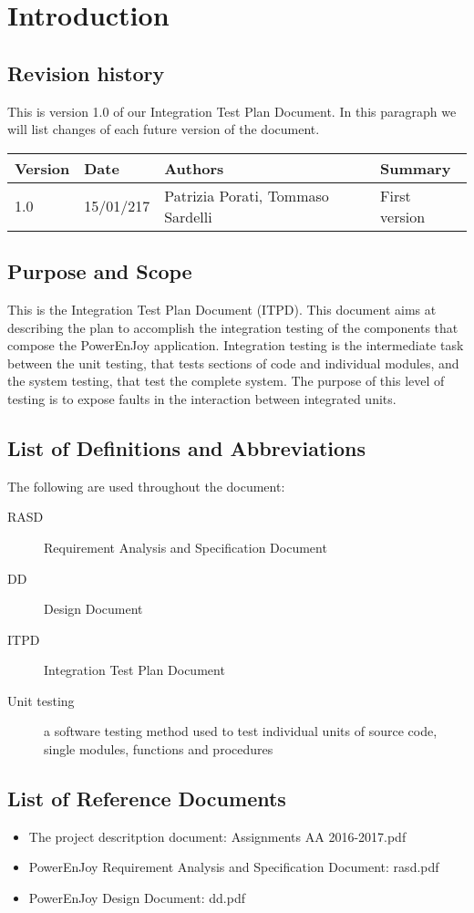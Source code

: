 \section{Introduction}

\subsection{Revision history}
This is version 1.0 of our Integration Test Plan Document.
In this paragraph we will list changes of each future version of the document.

\begin{tabular}{|l|l|l|l|}
	\hline
	\textbf{Version}	& \textbf{Date}	& \textbf{Authors}	& \textbf{Summary}\\
	\hline
	1.0					& 15/01/217		& Patrizia Porati, Tommaso Sardelli	& First version\\
	\hline
\end{tabular}

\subsection{Purpose and Scope}
This is the Integration Test Plan Document (ITPD). This document aims at describing the plan to accomplish the integration testing of the components that compose the PowerEnJoy application.
Integration testing is the intermediate task between the unit testing, that tests sections of code and individual modules, and the system testing, that test the complete system.
The purpose of this level of testing is to expose faults in the interaction between integrated units.

\subsection{List of Definitions and Abbreviations}
The following are used throughout the document:
\begin{description}
	\item [RASD] Requirement Analysis and Specification Document
	\item [DD] Design Document
	\item [ITPD] Integration Test Plan Document
	\item [Unit testing] a software testing method used to test individual units of source code, single modules, functions and procedures
\end{description}

\subsection{List of Reference Documents}
\begin{itemize}
	\item The project descritption document: Assignments AA 2016-2017.pdf
	\item PowerEnJoy Requirement Analysis and Specification Document: rasd.pdf
	\item PowerEnJoy Design Document: dd.pdf
\end{itemize}

